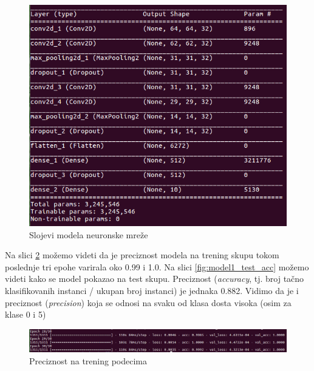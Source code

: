 \documentclass[a4paper]{article}
\begin{document}
\begin{figure}[h!]
\begin{center}
\includegraphics[scale=0.45]{model1_arhitektura.png}
\end{center}
\caption{Slojevi modela neuronske mreže}
\label{fig:model1_arh}
\end{figure}

Na slici \ref{fig:model1_trening_acc} možemo videti da je preciznost modela na trening skupu tokom poslednje tri epohe varirala oko 0.99 i 1.0. Na slici \ref{fig:model1_test_acc} možemo videti kako se model pokazao na test skupu. Preciznost (\textit{accuracy}, tj. broj tačno klasifikovanih instanci / ukupan broj instanci) je jednaka 0.882. Vidimo da je i preciznost (\textit{precision}) koja se odnosi na svaku od klasa dosta visoka (osim za klase 0 i 5)

\begin{figure}[h!]
\begin{center}
\includegraphics[scale=0.35]{model1_trening_acc.png}
\end{center}
\caption{Preciznost na trening podecima}
\label{fig:model1_trening_acc}
\end{figure}
\end{document}
